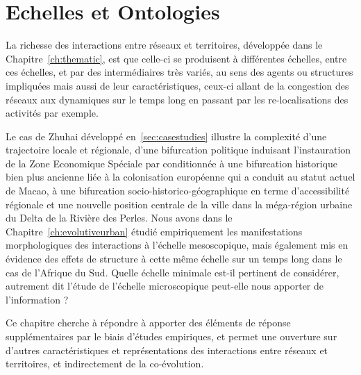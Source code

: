 





\chapter{Echelles et Ontologies}

\label{ch:micro} %







La richesse des interactions entre réseaux et territoires, développée dans le Chapitre~\ref{ch:thematic}, est que celle-ci se produisent à différentes échelles, entre ces échelles, et par des intermédiaires très variés, au sens des agents ou structures impliquées mais aussi de leur caractéristiques, ceux-ci allant de la congestion des réseaux aux dynamiques sur le temps long en passant par les re-localisations des activités par exemple.


Le cas de Zhuhai développé en~\ref{sec:casestudies} illustre la complexité d'une trajectoire locale et régionale, d'une bifurcation politique induisant l'instauration de la Zone Economique Spéciale par  conditionnée à une bifurcation historique bien plus ancienne liée à la colonisation européenne qui a conduit au statut actuel de Macao, à une bifurcation socio-historico-géographique en terme d'accessibilité régionale et une nouvelle position centrale de la ville dans la méga-région urbaine du Delta de la Rivière des Perles. Nous avons dans le Chapitre~\ref{ch:evolutiveurban} étudié empiriquement les manifestations morphologiques des interactions à l'échelle mesoscopique, mais également mis en évidence des effets de structure à cette même échelle sur un temps long dans le cas de l'Afrique du Sud. Quelle échelle minimale est-il pertinent de considérer, autrement dit l'étude de l'échelle microscopique peut-elle nous apporter de l'information ? 

Ce chapitre cherche à répondre à apporter des éléments de réponse supplémentaires par le biais d'études empiriques, et permet une ouverture sur d'autres caractéristiques et représentations des interactions entre réseaux et territoires, et indirectement de la co-évolution.


